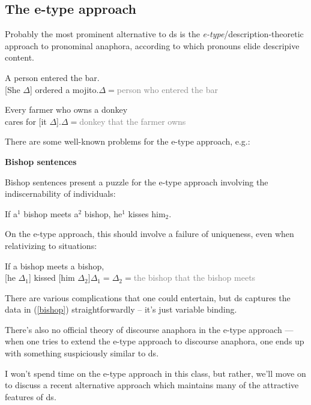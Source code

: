 \documentclass[nols,twoside,nofonts,nobib,nohyper]{tufte-handout}
\theoremstyle{observation}
\theoremstyle{theorem}
\theoremstyle{corollary}
\theoremstyle{definition}
\begin{document}
\subsection{The e-type approach}

Probably the most prominent alternative to \ac{ds} is the \textit{e-type}/description-theoretic approach to pronominal anaphora, according to which pronouns elide descripive content.

\ex
A person entered the bar.\\
{}[She $Δ$] ordered a mojito.\hfill$Δ = $\textcolor{gray}{person who entered the bar}
\xe

\ex
Every farmer who owns a donkey\\
cares for [it $Δ$].\hfill$Δ = $\textcolor{gray}{donkey that the farmer owns}
\xe

There are some well-known problems for the e-type approach, e.g.:

\textbf{Bishop sentences}

Bishop sentences present a puzzle for the e-type approach involving the indiscernability of individuals:

\ex
If a$^{1}$ bishop meets a$^{2}$ bishop, he$^{1}$ kisses him$_{2}$.\label{bishop}
\xe

On the e-type approach, this should involve a failure of uniqueness, even when relativizing to situations:

\ex
If a bishop meets a bishop,\\
{}[he $Δ_{1}$] kissed [him $Δ_{2}$]\hfill$Δ_{1} = Δ_{2} =$\textcolor{gray}{the bishop that the bishop meets}
\xe

There are various complications that one could entertain, but \ac{ds} captures the data in (\ref{bishop}) straightforwardly -- it's just variable binding.

There's also no official theory of discourse anaphora in the e-type approach --- when one tries to extend the e-type approach to discourse anaphora, one ends up with something suspiciously similar to \ac{ds}.

I won't spend time on the e-type approach in this class, but rather, we'll move on to discuss a recent alternative approach which maintains many of the attractive features of \ac{ds}.
\end{document}
